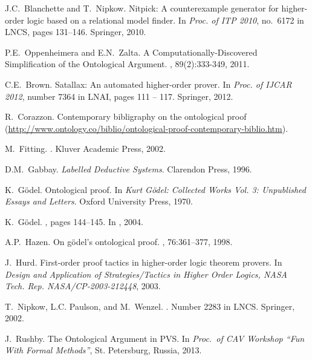 \documentclass{llncs}
\begin{document}
\begin{thebibliography}{10}
J.C.~Blanchette and T.~Nipkow.
\newblock Nitpick: A counterexample generator for higher-order logic based on a
  relational model finder.
\newblock In {\em Proc. of ITP 2010}, no.~6172 in LNCS, pages 131--146.
  Springer, 2010.

P.E.~Oppenheimera and E.N.~Zalta.
\newblock A Computationally-Discovered Simplification of the Ontological Argument.
, 89(2):333-349, 2011.

C.E.~Brown.
\newblock Satallax: An automated higher-order prover.
\newblock In {\em Proc. of IJCAR 2012}, number 7364 in LNAI, pages 111 -- 117.
  Springer, 2012.

R.~Corazzon.
\newblock Contemporary bibligraphy on the ontological proof
  (\url{http://www.ontology.co/biblio/ontological-proof-contemporary-biblio.htm}).

M.~Fitting.
.
\newblock Kluver Academic Press, 2002.

D.M.~Gabbay. {\em Labelled Deductive Systems}. Clarendon Press, 1996.

K.~G\"odel.
\newblock Ontological proof.
\newblock In {\em {Kurt G\"odel: Collected Works Vol. 3: Unpublished Essays and
  Letters}}. Oxford University Press, 1970.

K.~G\"odel.
, pages 144--145.
\newblock In  \cite{sobel2004logic}, 2004.

A.P.~Hazen.
\newblock On g\"odel's ontological proof.
, 76:361--377, 1998.

J.~Hurd.
\newblock First-order proof tactics in higher-order logic theorem provers.
\newblock In {\em Design and Application of Strategies/Tactics in Higher Order
  Logics, NASA Tech. Rep. NASA/CP-2003-212448}, 2003.

T.~Nipkow, L.C. Paulson, and M.~Wenzel.
.
\newblock Number 2283 in LNCS. Springer, 2002.

J.~Rushby.
\newblock The Ontological Argument in PVS. 
\newblock In {\em Proc.~of CAV Workshop ``Fun With Formal Methods''}, St. Petersburg, Russia, 2013.


\end{thebibliography}
\end{document}
